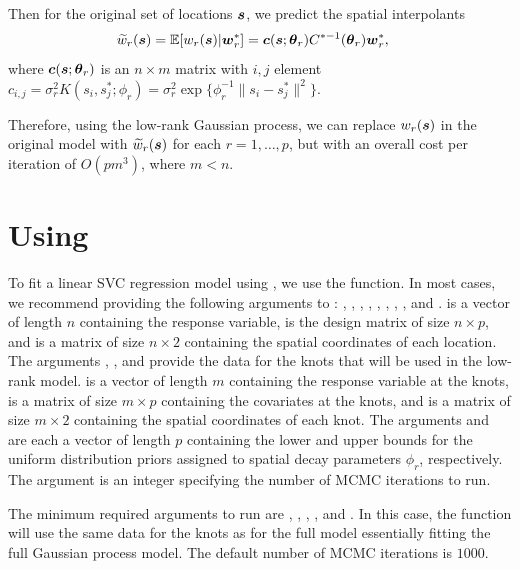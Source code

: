 Then for the original set of locations $\boldsymbol{s}$, we predict the spatial interpolants 
\begin{align*}
    \widetilde{w}_r(\boldsymbol{s}) &= \mathbb{E}[w_r(\boldsymbol{s})|\boldsymbol{w}_r^*] = \boldsymbol{c} (\boldsymbol{s}; \boldsymbol{\theta}_r) C^{*-1}(\boldsymbol{\theta}_r)\boldsymbol{w}_r^*,
\end{align*}
where $\boldsymbol{c} (\boldsymbol{s}; \boldsymbol{\theta}_r)$ is an $n \times m$ matrix with $i, j$ element $c_{i, j} = \sigma_r^2 K(s_i, s_j^*; \phi_r) = \sigma_r^2 \exp\{\phi_r^{-1}\|s_i-s_j^*\|^2\}$.

Therefore, using the low-rank Gaussian process, we can replace $w_r(\boldsymbol{s})$ in the original model with $\widetilde{w}_r(\boldsymbol{s})$ for each $r = 1, \dots, p$, but with an overall cost per iteration of $O(pm^3)$, where $m < n$.

\section{Using }
\label{sec:using}

To fit a linear SVC regression model using , we use the  function. In most cases, we recommend providing the following arguments to : , , , , , , , , and .  is a vector of length $n$ containing the response variable,  is the design matrix of size $n \times p$, and  is a matrix of size $n \times 2$ containing the spatial coordinates of each location. The arguments , , and  provide the data for the knots that will be used in the low-rank model.  is a vector of length $m$ containing the response variable at the knots,  is a matrix of size $m \times p$ containing the covariates at the knots, and  is a matrix of size $m \times 2$ containing the spatial coordinates of each knot. The arguments  and  are each a vector of length $p$ containing the lower and upper bounds for the uniform distribution priors assigned to spatial decay parameters $\phi_r$, respectively. The argument  is an integer specifying the number of MCMC iterations to run.

The minimum required arguments to run  are , , , , and . In this case, the function will use the same data for the knots as for the full model essentially fitting the full Gaussian process model. The default number of MCMC iterations is $1000$.

